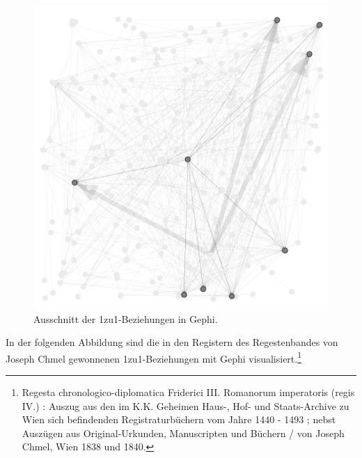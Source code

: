 \documentclass[ngerman,]{scrreprt}
\begin{document}
\begin{figure}
\centering
\includegraphics{Bilder/Gephi-Register.png}
\caption{Ausschnitt der 1zu1-Beziehungen in Gephi.}
\end{figure}

In der folgenden Abbildung sind die in den Registern des Regestenbandes von Joseph Chmel gewonnenen 1zu1-Beziehungen mit Gephi visualisiert.\footnote{Regesta chronologico-diplomatica Friderici III. Romanorum imperatoris (regis IV.) : Auszug aus den im K.K. Geheimen Haus-, Hof- und Staats-Archive zu Wien sich befindenden Registraturbüchern vom Jahre 1440 - 1493 ; nebst Auszügen aus Original-Urkunden, Manuscripten und Büchern / von Joseph Chmel, Wien 1838 und 1840.}
\end{document}
